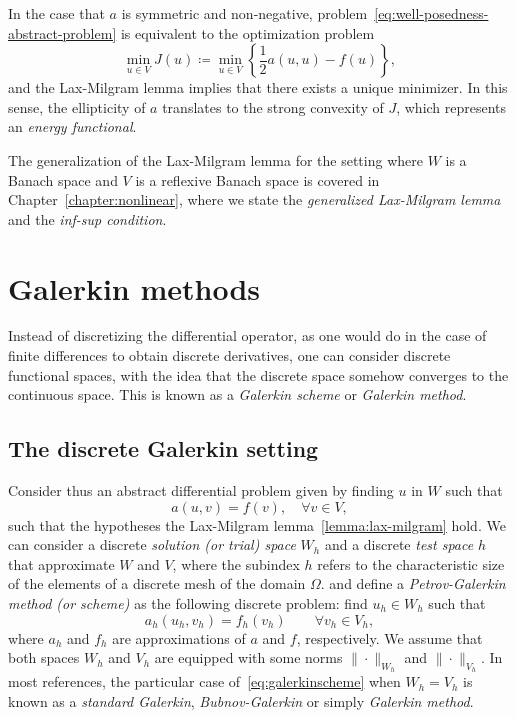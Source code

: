 In the case that $a$ is symmetric and non-negative, problem~\ref{eq:well-posedness-abstract-problem} is equivalent to the optimization problem 
\begin{equation*}
    \min_{u\in V} J(u) \coloneqq \min_{u\in V} \left\{\frac{1}{2}a(u,u) - f(u)\right\},
\end{equation*}
and the Lax-Milgram lemma implies that there exists a unique minimizer. In this sense, the ellipticity of $a$ translates to the strong convexity of $J$, which represents an \emph{energy functional}. 

The generalization of the Lax-Milgram lemma for the setting where $W$ is a Banach space and $V$ is a reflexive Banach space is covered in Chapter~\ref{chapter:nonlinear}, where we state the \emph{generalized Lax-Milgram lemma} and the \emph{inf-sup condition}. 

\section{Galerkin methods}\label{sec:galerkin}
Instead of discretizing the differential operator, as one would do in the case of finite differences to obtain discrete derivatives, one can consider discrete functional spaces, with the idea that the discrete space somehow converges to the continuous space. This is known as a \emph{Galerkin scheme} or \emph{Galerkin method}.

\subsection{The discrete Galerkin setting}
Consider thus an abstract differential problem given by finding $u$ in $W$ such that
\begin{equation}
    a(u, v) = f(v), \quad \forall v \in V,
\end{equation}
such that the hypotheses the Lax-Milgram lemma~\ref{lemma:lax-milgram} hold. We can consider a discrete \emph{solution (or trial) space} $W_h$ and a discrete \emph{test space} $h$ that approximate $W$ and $V$, where the subindex $h$ refers to the characteristic size of the elements of a discrete mesh of the domain $\Omega$. and define a \emph{Petrov-Galerkin method (or scheme)} as the following discrete problem: find $u_h \in W_h$ such that 
\begin{equation}\label{eq:galerkinscheme}
    a_h(u_h, v_h) = f_h(v_h) \qquad \forall v_h \in V_h,
\end{equation}
where $a_h$ and $f_h$ are approximations of $a$ and $f$, respectively. 
We assume that both spaces $W_h$ and $V_h$ are equipped with some norms $\|\cdot\|_{W_h}$ and $\|\cdot\|_{V_h}$. In most references, the particular case of~\ref{eq:galerkinscheme} when $W_h = V_h$ is known as a \emph{standard Galerkin}, \emph{Bubnov-Galerkin} or simply \emph{Galerkin method}. 

